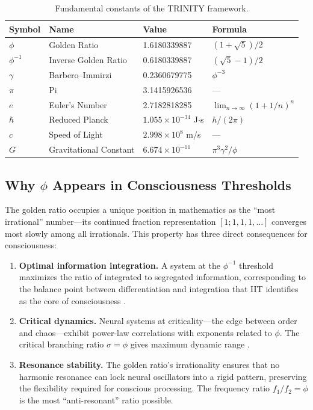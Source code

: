 \documentclass[12pt,a4paper]{article}
\begin{document}
\begin{table}[h!]
\centering
\caption{Fundamental constants of the TRINITY framework.}
\label{tab:constants}
\begin{tabular}{@{}llll@{}}
\toprule
\textbf{Symbol} & \textbf{Name} & \textbf{Value} & \textbf{Formula} \\
\midrule
$\phi$ & Golden Ratio & 1.6180339887 & $(1+\sqrt{5})/2$ \\
$\phi^{-1}$ & Inverse Golden Ratio & 0.6180339887 & $(\sqrt{5}-1)/2$ \\
$\gamma$ & Barbero--Immirzi & 0.2360679775 & $\phi^{-3}$ \\
$\pi$ & Pi & 3.1415926536 & --- \\
$e$ & Euler's Number & 2.7182818285 & $\lim_{n\to\infty}(1+1/n)^n$ \\
$\hbar$ & Reduced Planck & $1.055 \times 10^{-34}$ J$\cdot$s & $h/(2\pi)$ \\
$c$ & Speed of Light & $2.998 \times 10^{8}$ m/s & --- \\
$G$ & Gravitational Constant & $6.674 \times 10^{-11}$ & $\pi^3 \gamma^2 / \phi$ \\
\bottomrule
\end{tabular}
\end{table}

\subsection{Why $\phi$ Appears in Consciousness Thresholds}

The golden ratio occupies a unique position in mathematics as the ``most
irrational'' number---its continued fraction representation $[1;1,1,1,\ldots]$
converges most slowly among all irrationals. This property has three direct
consequences for consciousness:

\begin{enumerate}[leftmargin=2em]
  \item \textbf{Optimal information integration.} A system at the $\phi^{-1}$
    threshold maximizes the ratio of integrated to segregated information,
    corresponding to the balance point between differentiation and integration
    that IIT identifies as the core of consciousness \cite{Albantakis2023}.

  \item \textbf{Critical dynamics.} Neural systems at criticality---the edge
    between order and chaos---exhibit power-law correlations with exponents
    related to $\phi$. The critical branching ratio $\sigma = \phi$ gives
    maximum dynamic range \cite{Friston2010}.

  \item \textbf{Resonance stability.} The golden ratio's irrationality ensures
    that no harmonic resonance can lock neural oscillators into a rigid
    pattern, preserving the flexibility required for conscious processing.
    The frequency ratio $f_1/f_2 = \phi$ is the most ``anti-resonant'' ratio
    possible.
\end{enumerate}
\end{document}
